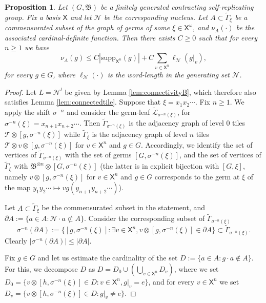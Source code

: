 \documentclass[11pt]{amsart}
\newcommand{\bim}{\mathfrak{B}}
\newcommand{\til}{\mathcal{T}}
\newcommand{\xo}{\alb^\omega}
\newcommand{\leaf}{\mathcal{L}}
\newcommand{\leaftilde}{\widetilde{\leaf}}
\newcommand{\alb}{\ensuremath{\mathsf{X}}}%
\newcommand{\nuke}{\ensuremath{\mathcal{N}}}%
\newcommand{\Gammatilde}{\ensuremath{\widetilde{\Gamma}}}%
\theoremstyle{definition}
\theoremstyle{plain}
\newtheorem{main thm}{Theorem}
\newtheorem{prop}[defin]{Proposition}
\theoremstyle{remark}
\theoremstyle{plain}
\begin{document}
\begin{prop} \label{p-contracting-cardinal-definite}
Let $(G, \bim)$ be a finitely generated contracting self-replicating group. Fix a basis $\alb$ and let $\nuke$ be the corresponding nucleus. Let $A\subset \Gammatilde_\xi$ be a commensurated subset of the graph of germs of some $\xi\in \xo$, and $\nu_A(\cdot)$ be the associated cardinal-definite function.  Then there exists $C\ge 0$ such that for every $n\ge 1$ we have 
\[\nu_A(g)\leq C|\mathrm{supp}_{\alb^n}(g)|+ C\sum_{v\in \alb^n} \ell_\nuke(g|_v),\]
for every $g\in G$, where $\ell_\nuke(\cdot)$ is the word-length in the generating set $\nuke$. 
\end{prop}
\begin{proof}
 Let $L=\nuke^l$ be given by Lemma \ref{lem:connectivityB}, which therefore also satisfies Lemma \ref{lem:connectedtile}. Suppose that $\xi=x_1x_2\cdots$. Fix $n\ge 1$. We apply the shift $\sigma^{-n}$ and consider the germ-leaf $\leaftilde_{\sigma^{-n}(\xi)}$, for $\sigma^{-n}(\xi)=x_{n+1}x_{n+2}\cdots$. Then $\Gammatilde_{\sigma^{-n}(\xi)}$ is the adjacency graph of level 0 tiles $\til\otimes [g, \sigma^{-n}(\xi)]$ while $\Gammatilde_\xi$ is the adjacency graph of level $n$ tiles $\til\otimes v\otimes[g, \sigma^{-n}(\xi)]$ for $v\in \alb^n$ and $g\in G$. Accordingly, we identify the set of vertices of $\Gammatilde_{\sigma^{-n}(\xi)}$ with the set of germs $[G, \sigma^{-n}(\xi)]$, and the set of vertices of $\Gammatilde_\xi$ with $\bim^{\otimes n}\otimes [G, \sigma^{-n}(\xi)]$  (the latter is in explicit bijection with $[G, \xi]$, namely $v\otimes[g, \sigma^{-n}(\xi)]$ for $v\in \alb^n$ and $g\in G$ corresponds to the germ at $\xi$ of the map $y_1y_2\cdots \mapsto vg(y_{n+1}y_{n+2}\cdots)$).

 Let $A\subset \Gammatilde_\xi$ be the commensurated subset in the statement, and $\partial A:=\{a\in A\colon \nuke \cdot a\not \subset A\}$. Consider the corresponding subset of $\Gammatilde_{\sigma^{-n}(\xi)}$
 \[\sigma^{-n}(\partial A):= \{[g, \sigma^{-n}(\xi)] \colon \exists v\in \alb^n,  v\otimes [g, \sigma^{-n}(\xi)] \in \partial A\}\subset \Gammatilde_{\sigma^{-n}(\xi)}.\]
Clearly  $|\sigma^{-n}(\partial A)|\leq |\partial A|$. 

Fix $g\in G$ and let us estimate the cardinality of the set $D:=\{a\in A \colon g\cdot a\notin A\}$. For this, we decompose $D$ as $D=D_0\cup (\bigcup_{v\in \alb^n} D_v)$,
where we set $D_0=\{v\otimes [h, \sigma^{-n}(\xi)] \in D \colon v\in \alb^n, g|_v=e\}$,  and  for every $v\in \alb^n$ we set $D_v=\{v\otimes [h, \sigma^{-n}(\xi)]\in D \colon g|_v\neq e\}$. 


\end{proof}
\end{document}
